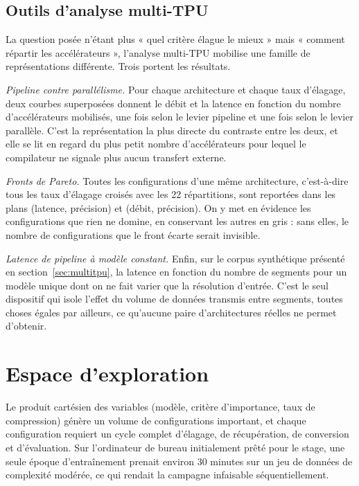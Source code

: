 \documentclass[11pt,a4paper]{report}
\begin{document}
\subsection{Outils d'analyse multi-TPU}

La question posée n'étant plus « quel critère élague le mieux » mais « comment répartir les accélérateurs », l'analyse multi-TPU mobilise une famille de représentations différente. Trois portent les résultats.

\emph{Pipeline contre parallélisme.} Pour chaque architecture et chaque taux d'élagage, deux courbes superposées donnent le débit et la latence en fonction du nombre d'accélérateurs mobilisés, une fois selon le levier pipeline et une fois selon le levier parallèle. C'est la représentation la plus directe du contraste entre les deux, et elle se lit en regard du plus petit nombre d'accélérateurs pour lequel le compilateur ne signale plus aucun transfert externe.

\emph{Fronts de Pareto.} Toutes les configurations d'une même architecture, c'est-à-dire tous les taux d'élagage croisés avec les 22 répartitions, sont reportées dans les plans (latence, précision) et (débit, précision). On y met en évidence les configurations que rien ne domine, en conservant les autres en gris : sans elles, le nombre de configurations que le front écarte serait invisible.

\emph{Latence de pipeline à modèle constant.} Enfin, sur le corpus synthétique présenté en section~\ref{sec:multitpu}, la latence en fonction du nombre de segments pour un modèle unique dont on ne fait varier que la résolution d'entrée. C'est le seul dispositif qui isole l'effet du volume de données transmis entre segments, toutes choses égales par ailleurs, ce qu'aucune paire d'architectures réelles ne permet d'obtenir.

\section{Espace d'exploration}
\label{sec:conditions}

Le produit cartésien des variables (modèle, critère d'importance, taux de compression) génère un volume de configurations important, et chaque configuration requiert un cycle complet d'élagage, de récupération, de conversion et d'évaluation. Sur l'ordinateur de bureau initialement prêté pour le stage, une seule époque d'entraînement prenait environ 30 minutes sur un jeu de données de complexité modérée, ce qui rendait la campagne infaisable séquentiellement.
\end{document}
